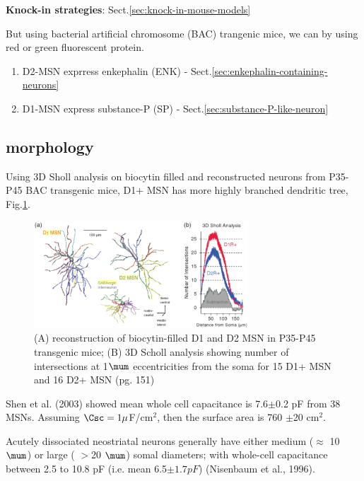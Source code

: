 {\bf Knock-in strategies}: Sect.\ref{sec:knock-in-mouse-models}

But using bacterial artificial chromosome (BAC) trangenic mice, we can by using
red or green fluorescent protein.
\begin{enumerate}
  \item D2-MSN exprress enkephalin (ENK) - Sect.\ref{sec:enkephalin-containing-neurons}
  
  \item D1-MSN express substance-P (SP) - Sect.\ref{sec:substance-P-like-neuron}
\end{enumerate}






\subsection{morphology}
\label{sec:MSN-morphology}

Using 3D Sholl analysis on biocytin filled and reconstructed neurons from
P35-P45 BAC transgenic mice, D1+ MSN has more highly branched dendritic tree,
Fig.\ref{fig:MSN-morphology}.

\begin{figure}[hbt]
 \centerline{\includegraphics[height=4cm]{./images/MSN-morphology.eps}}
\caption{(A) reconstruction of biocytin-filled D1 and D2 MSN in P35-P45
transgenic mice; (B) 3D Scholl analysis  showing number of intersections at
1$\mum$ eccentricities from the soma for 15 D1+ MSN and 16 D2+ MSN
\citep{bjorklund2010}(pg. 151)}
\label{fig:MSN-morphology}
\end{figure}

Shen et al. (2003) showed mean whole cell capacitance is 7.6$\pm$0.2 pF from 38
MSNs. Assuming $\Csc=1 \mu$F/cm$^2$, then the surface area is 760 $\pm$20
cm$^2$.

Acutely dissociated neostriatal neurons generally have either medium
($\approx$ 10 $\mum$) or large ( $>$20 $\mum$) somal diameters; with
whole-cell capacitance between 2.5 to 10.8 pF (i.e. mean 6.5$\pm 1.7 pF$)
(Nisenbaum et al., 1996).

